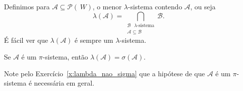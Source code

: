 \documentclass[../main/Notas_de_aula.tex]{subfiles}
\begin{document}
Definimos para $\mathcal{A} \subseteq \mathcal{P}(~W)$, o menor $\lambda$-sistema contendo $\mathcal{A}$, ou seja
\begin{equation}
  \lambda(\mathcal{A}) = \bigcap_{\substack{\text{$\mathcal{B}$ $\lambda$-sistema}\\\mathcal{A} \subseteq \mathcal{B}}} \mathcal{B}.
\end{equation}
É fácil ver que $\lambda(\mathcal{A})$ é sempre um $\lambda$-sistema.

\begin{theorem}[Dynkin]
  \label{t:dynkin}
  Se $\mathcal{A}$ é um $\pi$-sistema, então $\lambda(\mathcal{A}) = \sigma(\mathcal{A})$.
\end{theorem}

Note pelo Exercício~\ref{x:lambda_nao_sigma} que a hipótese de que $\mathcal{A}$ é um $\pi$-sistema é necessária em geral.
\end{document}
